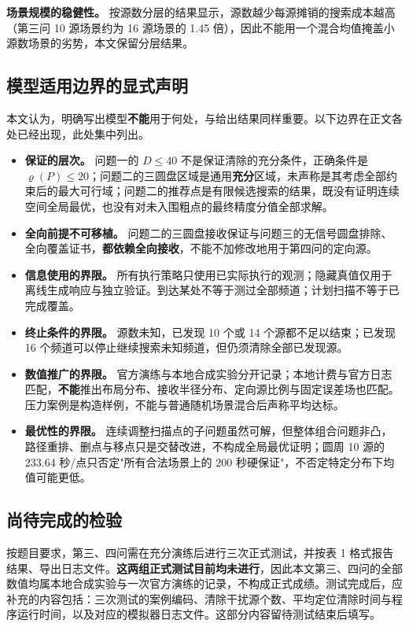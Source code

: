 \textbf{场景规模的稳健性。} 按源数分层的结果显示，源数越少每源摊销的搜索成本越高（第三问 10 源场景约为 16 源场景的 1.45 倍），因此不能用一个混合均值掩盖小源数场景的劣势，本文保留分层结果。

\subsection{模型适用边界的显式声明}

本文认为，明确写出模型\textbf{不能}用于何处，与给出结果同样重要。以下边界在正文各处已经出现，此处集中列出。

\begin{itemize}[label=\textbullet,leftmargin=2em]
  \item \textbf{保证的层次。} 问题一的 $D\le40$ 不是保证清除的充分条件，正确条件是 $\varrho(P)\le20$；问题二的三圆盘区域是通用\textbf{充分}区域，未声称是其考虑全部约束后的最大可行域；问题二的推荐点是有限候选搜索的结果，既没有证明连续空间全局最优，也没有对未入围粗点的最终精度分值全部求解。
  \item \textbf{全向前提不可移植。} 问题二的三圆盘接收保证与问题三的无信号圆盘排除、全向覆盖证书，\textbf{都依赖全向接收}，不能不加修改地用于第四问的定向源。
  \item \textbf{信息使用的界限。} 所有执行策略只使用已实际执行的观测；隐藏真值仅用于离线生成响应与独立验证。到达某处不等于测过全部频道；计划扫描不等于已完成覆盖。
  \item \textbf{终止条件的界限。} 源数未知，已发现 10 个或 14 个源都不足以结束；已发现 16 个频道可以停止继续搜索未知频道，但仍须清除全部已发现源。
  \item \textbf{数值推广的界限。} 官方演练与本地合成实验分开记录；本地计费与官方日志匹配，\textbf{不能}推出布局分布、接收半径分布、定向源比例与固定误差场也匹配。压力案例是构造样例，不能与普通随机场景混合后声称平均达标。
  \item \textbf{最优性的界限。} 连续调整扫描点的子问题虽然可解，但整体组合问题非凸，路径重排、删点与移点只是交替改进，不构成全局最优证明；圆周 10 源的 233.64 秒/点只否定"所有合法场景上的 200 秒硬保证"，不否定特定分布下均值可能更低。
\end{itemize}

\subsection{尚待完成的检验}

按题目要求，第三、四问需在充分演练后进行三次正式测试，并按表 1 格式报告结果、导出日志文件。\textbf{这两组正式测试目前均未进行}，因此本文第三、四问的全部数值均属本地合成实验与一次官方演练的记录，不构成正式成绩。测试完成后，应补充的内容包括：三次测试的案例编码、清除干扰源个数、平均定位清除时间与程序运行时间，以及对应的模拟器日志文件。这部分内容留待测试结束后填写。

